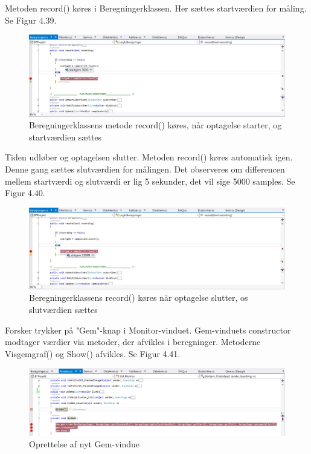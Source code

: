 Metoden record() køres i Beregningerklassen. Her sættes startværdien for måling. Se Figur 4.39.

\begin{figure}[H]
	\centering
	\includegraphics[width=1\textwidth]{Figurer/UC6_Record_Start}
	\caption{Beregningerklassens metode record() køres, når optagelse starter, og startværdien sættes}
\end{figure}

Tiden udløber og optagelsen slutter. Metoden record() køres automatisk igen. Denne gang sættes slutværdien for målingen. Det observeres om differencen mellem startværdi og slutværdi er lig 5 sekunder, det vil sige 5000 samples. Se Figur 4.40.

\begin{figure}[H]
	\centering
	\includegraphics[width=1\textwidth]{Figurer/UC6_Record_Slut}
	\caption{Beregningerklassens record() køres når optagelse slutter, os slutværdien sættes}
\end{figure}

Forsker trykker på "Gem"\--knap i Monitor-vinduet. Gem-vinduets constructor modtager værdier via metoder, der afvikles i beregninger. Metoderne Visgemgraf() og Show() afvikles. Se Figur 4.41.

\begin{figure}[H]
	\centering
	\includegraphics[width=1\textwidth]{Figurer/UC6_BtnGem}
	\caption{Oprettelse af nyt Gem-vindue}
\end{figure}


